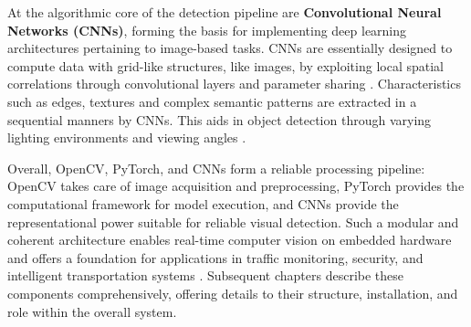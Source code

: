 At the algorithmic core of the detection pipeline are \textbf{Convolutional Neural Networks (CNNs)}, forming the basis for implementing deep learning architectures pertaining to image-based tasks. CNNs are essentially designed to compute data with grid-like structures, like images, by exploiting local spatial correlations through convolutional layers and parameter sharing \cite{lecun1998gradient,goodfellow2016deep}. Characteristics such as edges, textures and complex semantic patterns are extracted in a sequential manners by CNNs. This aids in object detection through varying lighting environments and viewing angles \cite{krizhevsky2012imagenet,simonyan2014very}. \newline

Overall, OpenCV, PyTorch, and CNNs form a reliable processing pipeline: OpenCV takes care of image acquisition and preprocessing, PyTorch provides the computational framework for model execution, and CNNs provide the representational power suitable for reliable visual detection. Such a modular and coherent architecture enables real-time computer vision on embedded hardware and offers a foundation for applications in traffic monitoring, security, and intelligent transportation systems \cite{jetsonpytorch,nvidia_jetson}. Subsequent chapters describe these components comprehensively, offering details to their structure, installation, and role within the overall system. \newline
